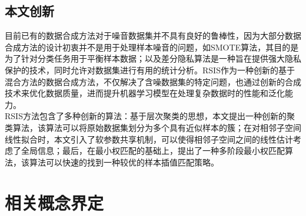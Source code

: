 \documentclass{NauThesis}
\begin{document}
\section{本文创新}
目前已有的数据合成方法对于噪音数据集并不具有良好的鲁棒性，因为大部分数据合成方法的设计初衷并不是用于处理样本噪音的问题，如SMOTE算法，其目的是为了针对分类任务用于平衡样本数据；以及差分隐私算法是一种旨在提供强大隐私保护的技术，同时允许对数据集进行有用的统计分析\cite{ref32,ref51}。RSIS作为一种创新的基于混合方法的数据合成方法，不仅解决了含噪数据集的特定问题，也通过创新的合成技术来优化数据质量，进而提升机器学习模型在处理复杂数据时的性能和泛化能力。
\\\hspace*{2em}RSIS方法包含了多种创新的算法：基于层次聚类的思想，本文提出一种创新的聚类算法，该算法可以将原始数据集划分为多个具有近似样本的簇；在对相邻子空间线性拟合时，本文引入了软参数共享机制，可以使得相邻子空间之间的线性估计考虑了全局信息；最后，在最小权匹配的基础上，提出了一种多阶段最小权匹配算法，该算法可以快速的找到一种较优的样本插值匹配策略。

\chapter{相关概念界定}
\end{document}
